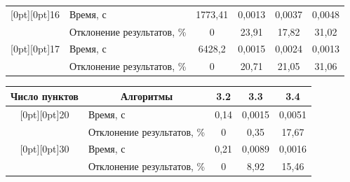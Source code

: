 \begin{table}[b]
\begin{center}
\begin{tabular}{|c|l|c|c|c|c|}
\hline


\multicolumn{1}{|c|}{\raisebox{-6pt}[0pt][0pt]{16\hphantom{9}}}&Время, с&1773,41&0,0013&0,0037&0,0048\\


&Отклонение результатов, \%&0&23,91&17,82&31,02\\


\hline


\multicolumn{1}{|c|}{\raisebox{-6pt}[0pt][0pt]{17\hphantom{9}}}&Время, с&6428,2&0,0015&0,0024&0,0013\\


&Отклонение результатов, \%&0&20,71&21,05&31,06\\


\hline


\end{tabular}


\end{center}


\vspace*{-12pt}






  \begin{center}




  \vspace*{2ex}


  


  \begin{tabular}{|c|l|c|c|c|}


  \hline 


Число пунктов&\multicolumn{1}{c|}{Алгоритмы} &3.2&3.3&3.4\\


\hline


\multicolumn{1}{|c|}{\raisebox{-6pt}[0pt][0pt]{20}}&Время, с&0,14&0,0015&0,0051\\


&Отклонение результатов, \%&0&0,35&17,67\\


\hline


\multicolumn{1}{|c|}{\raisebox{-6pt}[0pt][0pt]{30}}&Время, с&0,21&0,0089&0,0016\\


&Отклонение результатов, \%&0&8,92&15,46\\



\end{tabular}
\end{center}
\end{table}
